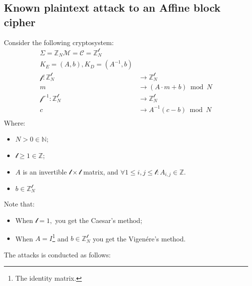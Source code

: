 \subsection{Known plaintext attack to an Affine block cipher}
Consider the following cryptosystem:
\begin{align*}
    \Sigma = \mathbb{Z}_{N}
    \mathcal{M} = \mathcal{C} = \mathbb{Z}_{N}^{\mathcal{l}} \\
    K_{E} = (A, b), K_{D} = (A^{-1}, b)\\
    \mathcal{f}: \mathbb{Z}_{N}^{\mathcal{l}} &\rightarrow \mathbb{Z}_{N}^{\mathcal{l}} \\
    m &\rightarrow (A \cdot m + b) \bmod N \\
    \mathcal{f}^{-1}: \mathbb{Z}_{N}^{\mathcal{l}} &\rightarrow \mathbb{Z}_{N}^{\mathcal{l}} \\
    c &\rightarrow A^{-1}(c - b) \bmod N \\
\end{align*}
Where:
\begin{itemize}
    \item $N > 0 \in \mathbb{N}$;
    \item $\mathcal{l} \geq 1 \in \mathbb{Z} $;
    \item $A$ is an invertible $\mathcal{l} \times \mathcal{l}$ matrix, and $\forall 1 \leq i,j \leq \mathcal{l}: A_{i,j} \in \mathbb{Z}$.
    \item $b \in \mathbb{Z}_{N}^{\mathcal{l}}$
\end{itemize}
Note that:
\begin{itemize}
    \item When $\mathcal{l} = 1, $ you get the Caesar's method;
    \item When $A = I$\footnote{The identity matrix.} and $b \in \mathbb{Z}_{N}^{\mathcal{l}}$ you get the Vigenére's method.
\end{itemize}
The attacks is conducted as follows:
